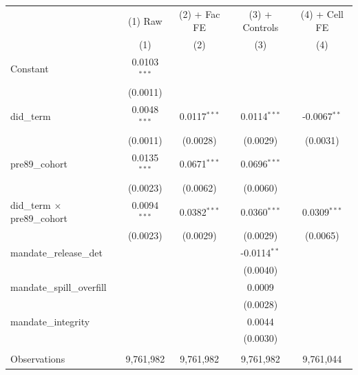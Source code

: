 
\begingroup
\centering
\begin{tabular}{lcccc}
   \toprule
                                            & (1) Raw        & (2) + Fac FE   & (3) + Controls & (4) + Cell FE \\   
                                            & (1)            & (2)            & (3)            & (4)\\  
   \midrule 
   Constant                                 & 0.0103$^{***}$ &                &                &   \\   
                                            & (0.0011)       &                &                &   \\   
   did\_term                                & 0.0048$^{***}$ & 0.0117$^{***}$ & 0.0114$^{***}$ & -0.0067$^{**}$\\   
                                            & (0.0011)       & (0.0028)       & (0.0029)       & (0.0031)\\   
   pre89\_cohort                            & 0.0135$^{***}$ & 0.0671$^{***}$ & 0.0696$^{***}$ &   \\   
                                            & (0.0023)       & (0.0062)       & (0.0060)       &   \\   
   did\_term $\times$ pre89\_cohort         & 0.0094$^{***}$ & 0.0382$^{***}$ & 0.0360$^{***}$ & 0.0309$^{***}$\\   
                                            & (0.0023)       & (0.0029)       & (0.0029)       & (0.0065)\\   
   mandate\_release\_det                    &                &                & -0.0114$^{**}$ &   \\   
                                            &                &                & (0.0040)       &   \\   
   mandate\_spill\_overfill                 &                &                & 0.0009         &   \\   
                                            &                &                & (0.0028)       &   \\   
   mandate\_integrity                       &                &                & 0.0044         &   \\   
                                            &                &                & (0.0030)       &   \\   
    \\
   Observations                             & 9,761,982      & 9,761,982      & 9,761,982      & 9,761,044\\  

\end{tabular}

